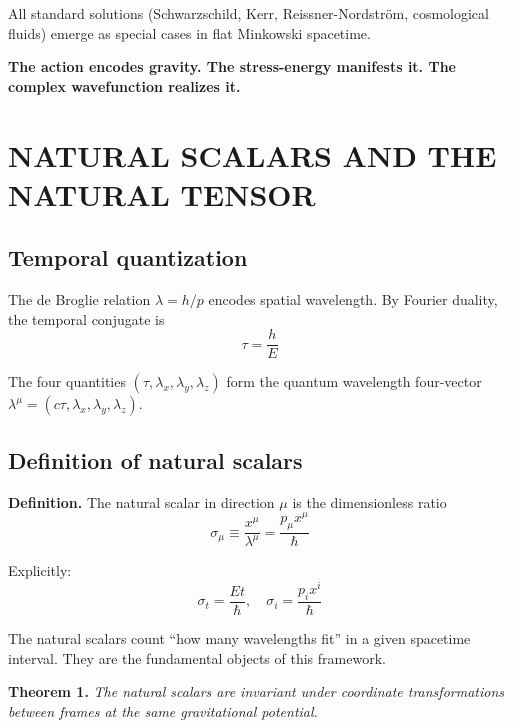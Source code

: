 \documentclass[11pt,a4paper]{article}
\theoremstyle{definition}
\theoremstyle{remark}
\begin{document}
	All standard solutions (Schwarzschild, Kerr, Reissner-Nordstr\"om, cosmological fluids) emerge as special cases in flat Minkowski spacetime.
	
	\bigskip
	\noindent\textbf{The action encodes gravity.  The stress-energy manifests it.  The complex wavefunction realizes it.}

		
 	\section{NATURAL SCALARS AND THE NATURAL TENSOR}
	\label{sec:natural}
	
	\subsection{Temporal quantization}
	
	The de Broglie relation $\lambda = h/p$ encodes spatial wavelength. By Fourier duality, the temporal conjugate is
	\begin{equation}
		\tau = \frac{h}{E}
		\label{eq:temporal_quantum}
	\end{equation}
	
	The four quantities $(\tau, \lambda_x, \lambda_y, \lambda_z)$ form the quantum wavelength four-vector $\lambda^\mu = (c\tau, \lambda_x, \lambda_y, \lambda_z)$.
	
	\subsection{Definition of natural scalars}
	
	\textbf{Definition.} The natural scalar in direction $\mu$ is the dimensionless ratio
	\begin{equation}
		\sigma_\mu \equiv \frac{x^\mu}{\lambda^\mu} = \frac{p_\mu x^\mu}{\hbar}
		\label{eq:natural_scalar}
	\end{equation}
	
	Explicitly:
	\begin{equation}
		\sigma_t = \frac{Et}{\hbar}, \quad \sigma_i = \frac{p_i x^i}{\hbar}
		\label{eq:natural_components}
	\end{equation}
	
	The natural scalars count ``how many wavelengths fit'' in a given spacetime interval. They are the fundamental objects of this framework.
	
	\textbf{Theorem 1.} \emph{The natural scalars are invariant under coordinate transformations between frames at the same gravitational potential.}
	
\end{document}
